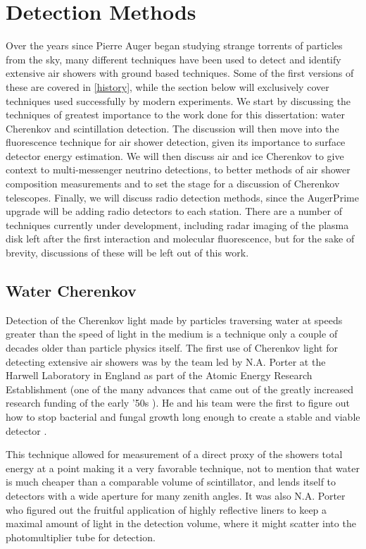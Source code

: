 \section{Detection Methods}
\label{detectors}
Over the years since Pierre Auger began studying strange torrents of particles from the sky, many different techniques have been used to detect and identify extensive air showers with ground based techniques. Some of the first versions of these are covered in \autoref{history}, while the section below will exclusively cover techniques used successfully by modern experiments. We start by discussing the techniques of greatest importance to the work done for this dissertation: water Cherenkov and scintillation detection. The discussion will then move into the fluorescence technique for air shower detection, given its importance to surface detector energy estimation. We will then discuss air and ice Cherenkov to give context to multi-messenger neutrino detections, to better methods of air shower composition measurements and to set the stage for a discussion of Cherenkov telescopes. Finally, we will discuss radio detection methods, since the AugerPrime upgrade will be adding radio detectors to each station. There are a number of techniques currently under development, including radar imaging of the plasma disk left after the first interaction and molecular fluorescence, but for the sake of brevity, discussions of these will be left out of this work.
\subsection{Water Cherenkov}
\label{wcd}
Detection of the Cherenkov light made by particles traversing water at speeds greater than the speed of light in the medium is a technique only a couple of decades older than particle physics itself. The first use of Cherenkov light for detecting extensive air showers was by the team led by N.A. Porter at the Harwell Laboratory in England as part of the Atomic Energy Research Establishment (one of the many advances that came out of the greatly increased research funding of the early '50s \cite{scifund1,firstcher}). He and his team were the first to figure out how to stop bacterial and fungal growth long enough to create a stable and viable detector \cite{firstcher}. 

This technique allowed for measurement of a direct proxy of the showers total energy at a point making it a very favorable technique, not to mention that water is much cheaper than a comparable volume of scintillator, and lends itself to detectors with a wide aperture for many zenith angles. It was also N.A. Porter who figured out the fruitful application of highly reflective liners to keep a maximal amount of light in the detection volume, where it might scatter into the photomultiplier tube for detection.

